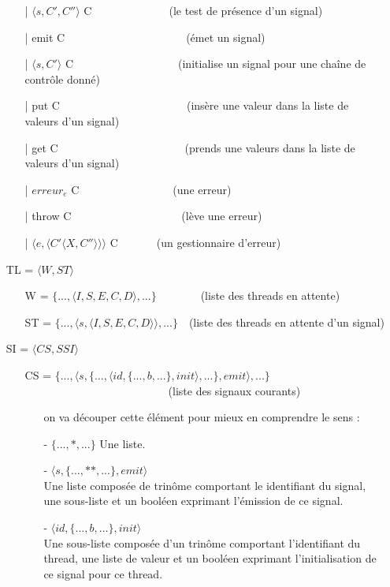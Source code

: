 \documentclass[10pt,a4paper]{article}
\begin{document}
\begin{itemize}
\begin{itemize}
					\item[|] $\langle s, C',C''\rangle$ C~~~~~~~~~~~~~~(le test de présence d'un signal)
					\item[|] emit C~~~~~~~~~~~~~~~~~~~~~~(émet un signal)
					\item[|] $\langle s,C'\rangle$ C~~~~~~~~~~~~~~~~~~~(initialise un signal pour une chaîne de contrôle donné)
					\item[|] put C~~~~~~~~~~~~~~~~~~~~~~~(insère une valeur dans la liste de valeurs d'un signal)
					\item[|] get C~~~~~~~~~~~~~~~~~~~~~~~(prends une valeurs dans la liste de valeurs d'un signal)
					\item[|] $erreur_{e}$ C~~~~~~~~~~~~~~~~~(une erreur)
					\item[|] throw C~~~~~~~~~~~~~~~~~~~~(lève une erreur)
					\item[|] $\langle e,\langle C'\langle X,C''\rangle\rangle\rangle$ C~~~~~~~(un gestionnaire d'erreur)
				\end{itemize}
				\item[] TL = $\langle W,ST\rangle$
				\begin{itemize}
					\item[] W = $\{...,\langle I,S,E,C,D\rangle,...\}$~~~~~~~~(liste des threads en attente)
					\item[] ST = $\{...,\langle s,\langle I,S,E,C,D\rangle\rangle,...\}$~~(liste des threads en attente d'un signal)
				\end{itemize} 
				\newpage
				\item[] SI = $\langle CS,SSI\rangle$
				\begin{itemize}
					\item[] CS = $\{...,\langle s,\{...,\langle id,\{...,b,...\},init\rangle,...\},emit\rangle,...\}$~~~~~~~~~~~~~~~~~~~~~~~~~~(liste des signaux courants)
					\begin{itemize}
						\item [] on va découper cette élément pour mieux en comprendre le sens :
						\item[] - $\{...,*,...\}$ Une liste. 
						\item[] - $\langle s,\{...,**,...\},emit\rangle$ \\
						Une liste composée de trinôme comportant le identifiant du signal, une sous-liste et un booléen exprimant l'émission de ce signal.
						\item[] - $\langle id,\{...,b,...\},init\rangle$ \\
						Une sous-liste composée d'un trinôme comportant l'identifiant du thread, une liste de valeur et un booléen exprimant l'initialisation de ce signal pour ce thread.

\end{itemize}
\end{itemize}
\end{itemize}
\end{document}
